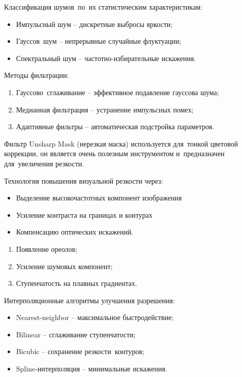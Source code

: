 \documentclass{ou}
\begin{document}
Классификация шумов~по~их статистическим характеристикам:
\begin{itemize}[label=-, leftmargin=0em, itemindent=3.35em, nosep]
\item Импульсный шум -- дискретные выбросы яркости;
\item Гауссов~шум -- непрерывные случайные флуктуации;
\item Спектральный шум -- частотно-избирательные искажения.
\end{itemize}

Методы фильтрации:
\begin{enumerate}[leftmargin=0em, itemindent=3.75em, nosep, label=\arabic*)]
\item Гауссово~сглаживание -- эффективное подавление гауссова шума;
\item Медианная фильтрация -- устранение импульсных помех;
\item Адаптивные фильтры -- автоматическая подстройка параметров\cite{cyberleninka}.
\end{enumerate}

Фильтр Unsharp Mask (нерезкая маска) используется для~тонкой цветовой коррекции, он является очень полезным инструментом и~предназначен для~увеличения резкости.

Технология повышения визуальной резкости через:
\begin{itemize}[label=-, leftmargin=0em, itemindent=3.35em, nosep]
\item Выделение высокочастотных компонент изображения
\item Усиление контраста на границах и контурах
\item Компенсацию оптических искажений.
\end{itemize}

\begin{enumerate}[leftmargin=0em, itemindent=3.75em, nosep, label=\arabic*)]
\item Появление ореолов;
\item Усиление шумовых компонент;
\item Ступенчатость на плавных градиентах\cite{Modern_Research_and_Innovations}.
\end{enumerate}

Интерполяционные алгоритмы улучшения разрешения:
\begin{itemize}[label=-, leftmargin=0em, itemindent=3.35em, nosep]
\item Nearest-neighbor -- максимальное быстродействие;
\item Bilinear -- сглаживание ступенчатости;
\item Bicubic -- сохранение резкости~контуров;
\item Spline-интерполяция -- минимальные искажения.
\end{itemize}
\end{document}
